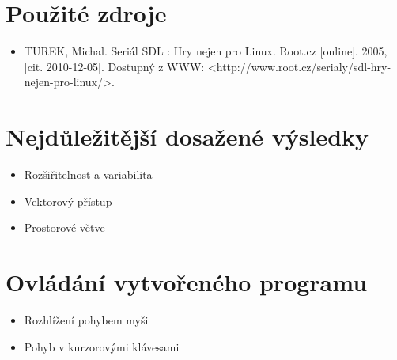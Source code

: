 \documentclass[11pt,a4paper]{article}
\begin{document}
\section{Použité zdroje}

%

\begin{itemize}
\item TUREK, Michal. Seriál SDL : Hry nejen pro Linux. Root.cz [online]. 2005, [cit. 2010-12-05]. Dostupný z WWW: <http://www.root.cz/serialy/sdl-hry-nejen-pro-linux/>.
\end{itemize}

\section{Nejdůležitější dosažené výsledky}


\begin{itemize}
\item Rozšiřitelnost a variabilita
\item Vektorový přístup
\item Prostorové větve
\end{itemize}

\section{Ovládání vytvořeného programu}

%

\begin{itemize}
\item Rozhlížení pohybem myši
\item Pohyb v kurzorovými klávesami
\end{itemize}
\end{document}
